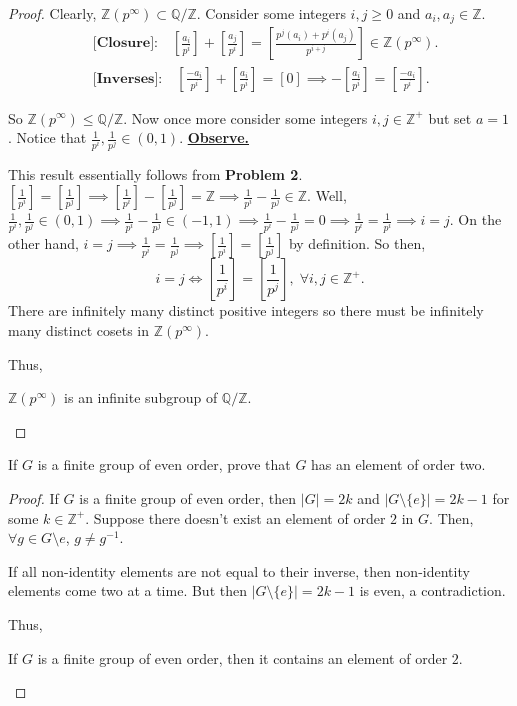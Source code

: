 \documentclass[addpoints,10pt]{exam}
\theoremstyle{plain}
\theoremstyle{definition}
\newtheorem{prob}[thm]{Problem}
\theoremstyle{plain}
\theoremstyle{plain}
\theoremstyle{definition}
\let\oldprob\prob
\let\endoldprob\endprob
\renewenvironment{prob}
  {\begin{singlespace}\oldprob}
  {\endoldprob\end{singlespace}}
\newcommand{\Observe}{\text{Observe.}}
\newcommand{\QQ}{\ensuremath{\mathbb{Q}}}
\newcommand{\ZZ}{\ensuremath{\mathbb{Z}}}
\begin{document}
\begin{proof}
    Clearly, $\ZZ(p^{\infty})\subset \QQ/\ZZ$. Consider some integers $i,j\geq 0$ and $a_{i},a_{j}\in \ZZ$. 
    \begin{align*}
    &\textbf{[Closure]:}\quad[\frac{a_{i}}{p^{i}}]+[\frac{a_{j}}{p^{i}}]=[\frac{p^{j}(a_{i})+p^{i}(a_{j})}{p^{i+j}}]\in \ZZ(p^{\infty}).\\
    &\textbf{[Inverses]:}\quad[\frac{-a_{i}}{p^{i}}]+[\frac{a_{i}}{p^{i}}]=[0]\implies -[\frac{a_{i}}{p^{i}}]=[\frac{-a_{i}}{p^{i}}].
    \end{align*}

    So $\ZZ(p^{\infty})\leq \QQ/\ZZ$. Now once more consider some integers $i,j\in \ZZ^{+}$ but set $a=1$. Notice that $\frac{1}{p^{i}},\frac{1}{p^{j}}\in (0,1)$. \underline{\textbf{Observe.}}

    This result essentially follows from \textbf{Problem 2}. $[\frac{1}{p^{i}}]=[\frac{1}{p^{j}}]\implies [\frac{1}{p^{i}}]-[\frac{1}{p^{j}}]=\ZZ\implies \frac{1}{p^{i}}-\frac{1}{p^{j}}\in \ZZ$. Well, $\frac{1}{p^{i}},\frac{1}{p^{j}}\in (0,1)\implies \frac{1}{p^{i}}-\frac{1}{p^{j}}\in (-1,1)\implies \frac{1}{p^{i}}-\frac{1}{p^{j}}=0\implies \frac{1}{p^{i}}=\frac{1}{p^{i}}\implies i=j$. On the other hand, $i=j\implies \frac{1}{p^{i}}=\frac{1}{p^{j}}\implies [\frac{1}{p^{i}}]=[\frac{1}{p^{j}}]$ by definition. So then,
    $$i=j\iff [\frac{1}{p^{i}}]=[\frac{1}{p^{j}}],\;\forall i,j\in \ZZ^{+}.$$
    There are infinitely many distinct positive integers so there must be infinitely many distinct cosets in $\ZZ(p^{\infty})$.

    Thus,
    \begin{center}
    $\ZZ(p^{\infty})$ is an infinite subgroup of $\QQ/\ZZ$.
    \end{center}
\end{proof}
\newpage

\begin{prob}
If $G$ is a finite group of even order, prove that $G$ has an element of order two. 
\end{prob}

\begin{proof}
If $G$ is a finite group of even order, then $|G|=2k$ and $|G\setminus\{e\}|=2k-1$ for some $k\in \ZZ^{+}.$ Suppose there doesn't exist an element of order $2$ in $G$. Then, $\forall g\in G\setminus{e}$, $g\neq g^{-1}$. \Observe

If all non-identity elements are not equal to their inverse, then non-identity elements come two at a time. But then $|G\setminus \{e\}|=2k-1$ is even, a contradiction.

Thus,

\begin{center}
If $G$ is a finite group of even order, then it contains an element of order $2$.
\end{center}
\end{proof}
\end{document}
